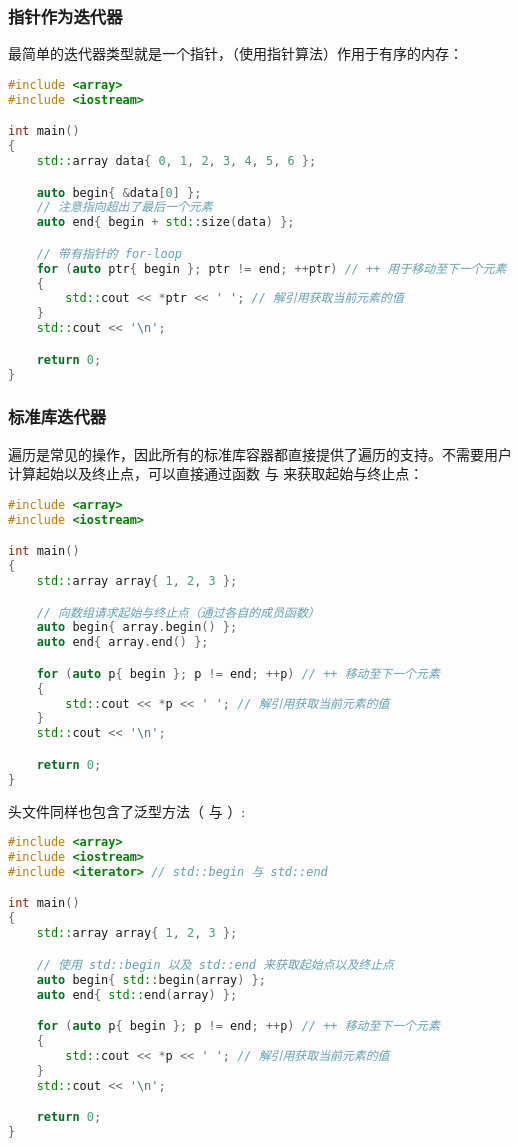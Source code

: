 \documentclass[../../LearnCpp.tex]{subfiles}
\begin{document}
\subsubsection*{指针作为迭代器}

最简单的迭代器类型就是一个指针，（使用指针算法）作用于有序的内存：

\begin{lstlisting}[language=C++]
#include <array>
#include <iostream>

int main()
{
    std::array data{ 0, 1, 2, 3, 4, 5, 6 };

    auto begin{ &data[0] };
    // 注意指向超出了最后一个元素
    auto end{ begin + std::size(data) };

    // 带有指针的 for-loop
    for (auto ptr{ begin }; ptr != end; ++ptr) // ++ 用于移动至下一个元素
    {
        std::cout << *ptr << ' '; // 解引用获取当前元素的值
    }
    std::cout << '\n';

    return 0;
}
\end{lstlisting}

\subsubsection*{标准库迭代器}

遍历是常见的操作，因此所有的标准库容器都直接提供了遍历的支持。不需要用户计算起始以及终止点，可以直接通过函数  与  来获取起始与终止点：

\begin{lstlisting}[language=C++]
#include <array>
#include <iostream>

int main()
{
    std::array array{ 1, 2, 3 };

    // 向数组请求起始与终止点（通过各自的成员函数）
    auto begin{ array.begin() };
    auto end{ array.end() };

    for (auto p{ begin }; p != end; ++p) // ++ 移动至下一个元素
    {
        std::cout << *p << ' '; // 解引用获取当前元素的值
    }
    std::cout << '\n';

    return 0;
}
\end{lstlisting}

 头文件同样也包含了泛型方法（ 与 ）:

\begin{lstlisting}[language=C++]
#include <array>
#include <iostream>
#include <iterator> // std::begin 与 std::end

int main()
{
    std::array array{ 1, 2, 3 };

    // 使用 std::begin 以及 std::end 来获取起始点以及终止点
    auto begin{ std::begin(array) };
    auto end{ std::end(array) };

    for (auto p{ begin }; p != end; ++p) // ++ 移动至下一个元素
    {
        std::cout << *p << ' '; // 解引用获取当前元素的值
    }
    std::cout << '\n';

    return 0;
}
\end{lstlisting}
\end{document}
